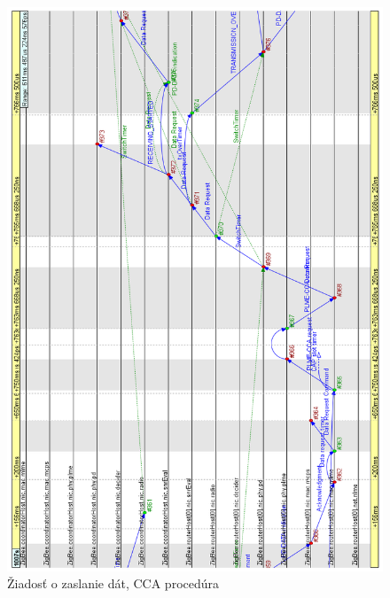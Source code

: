 {\begin{figure}[htbp]
\begin{center}
\includegraphics[width=140mm]{figures/chart_data_request}
\caption{Žiadosť o zaslanie dát, CCA procedúra}
\label{fig:chart_data_request}
\end{center}
\end{figure}
\begin{figure}[htbp]
\begin{center}

\end{center}
\end{figure}}
